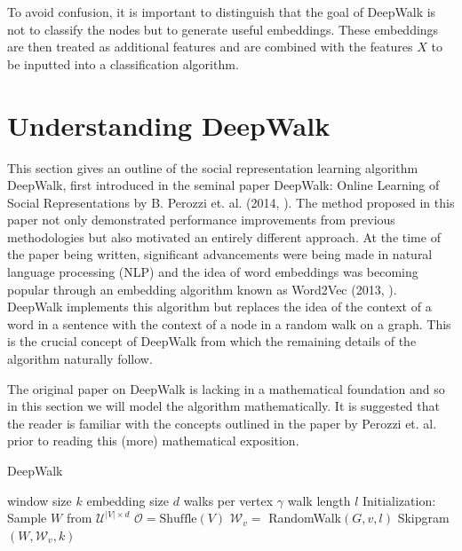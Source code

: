 \documentclass[a4paper]{article}
\begin{document}
To avoid confusion, it is important to distinguish that the goal of DeepWalk is
not to classify the nodes but to generate useful embeddings. These embeddings
are then treated as additional features and are combined with the features $X$
to be inputted into a classification algorithm.
\section{Understanding DeepWalk}
This section gives an outline of the social representation learning algorithm
DeepWalk, first introduced in the seminal paper DeepWalk: Online Learning of
Social Representations by B. Perozzi et. al. (2014, \cite{deepwalk}). The method proposed in
this paper not only demonstrated performance improvements from previous methodologies but
also motivated an entirely different approach. At the time of the paper being
written, significant advancements were being made in natural language processing (NLP)
and the idea of word embeddings was becoming popular through an embedding
algorithm known as Word2Vec (2013, \cite{mikolov2013efficient,mikolov2013distributed}).
DeepWalk implements this algorithm but replaces the idea of the context of a word in
a sentence with the context of a node in a random walk on a graph. This is the
crucial concept of DeepWalk from which the remaining details of the algorithm naturally follow.

The original paper on DeepWalk is lacking in a mathematical foundation and so in
this section we will model the algorithm mathematically. It is suggested that the reader
is familiar with the concepts outlined in the paper by Perozzi et. al. prior to
reading this (more) mathematical exposition.
\begin{algorithm}
  \caption{DeepWalk}
  \begin{algorithmic}[1]
    \Statex window size $k$
    \Statex embedding size $d$
    \Statex walks per vertex $\gamma$
    \Statex walk length $l$
    \State Initialization: Sample $W$ from $\mathcal{U}^{|V| \times d}$
    \State $\mathcal{O} = \text{Shuffle}(V)$
    \State $\mathcal{W}_v =$ RandomWalk$(G, v, l)$
    \State Skipgram$(W, \mathcal{W}_v, k)$
    \EndFor
    \EndFor
  \end{algorithmic}
\end{algorithm}
\end{document}
